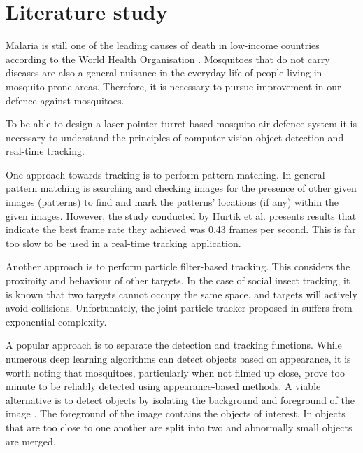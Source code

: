 
\section{Literature study}

Malaria is still one of the leading causes of death in low-income countries according to the World Health Organisation \cite{WHO2020}. Mosquitoes that do not carry diseases are also a general nuisance in the everyday life of people living in mosquito-prone areas. Therefore, it is necessary to pursue improvement in our defence against mosquitoes.

To be able to design a laser pointer turret-based mosquito air defence system it is necessary to understand the principles of computer vision object detection and real-time tracking.

One approach towards tracking is to perform pattern matching. In general pattern matching is searching and checking images for the presence of other given images (patterns) to find and mark the patterns' locations (if any) within the given images. However, the study conducted by Hurtik et al. \cite{Hurtik2018} presents results that indicate the best frame rate they achieved was 0.43 frames per second. This is far too slow to be used in a real-time tracking application.

Another approach is to perform particle filter-based tracking. This considers the proximity and behaviour of other targets. In the case of social insect tracking, it is known that two targets cannot occupy the same space, and targets will actively avoid collisions. Unfortunately, the joint particle tracker proposed in \cite{Khan2003} suffers from exponential complexity.

A popular approach is to separate the detection and tracking functions. While numerous deep learning algorithms can detect objects based on appearance, it is worth noting that mosquitoes, particularly when not filmed up close, prove too minute to be reliably detected using appearance-based methods. A viable alternative is to detect objects by isolating the background and foreground of the image \cite{Liang2016}. The foreground of the image contains the objects of interest. In \cite{Bao2018} objects that are too close to one another are split into two and abnormally small objects are merged.

